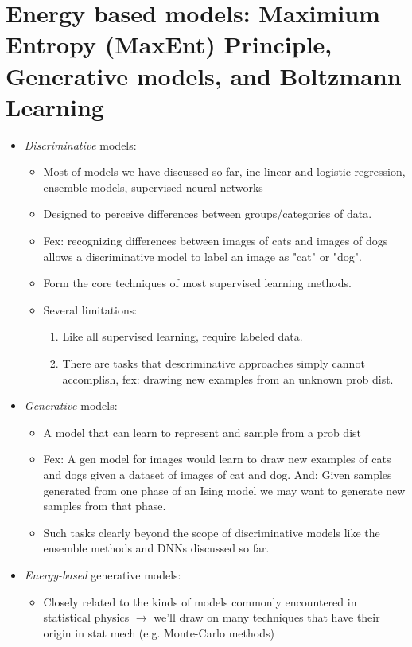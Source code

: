 \documentclass[norsk,a4paper,11pt]{article}
\begin{document}
\section{Energy based models: Maximium Entropy (MaxEnt) Principle, Generative models, and Boltzmann Learning}
\begin{itemize}
	\item \textit{Discriminative} models: 
	\begin{itemize}
		\item Most of models we have discussed so far, inc linear and logistic regression, ensemble models, supervised neural networks
		\item Designed to perceive differences between groups/categories of data.
		\item Fex: recognizing differences between images of cats and images of dogs allows a discriminative model to label an image as "cat" or "dog".
		\item Form the core techniques of most supervised learning methods.
		\item Several limitations: 
		\begin{enumerate}
			\item Like all supervised learning, require labeled data.
			\item There are tasks that descriminative approaches simply cannot accomplish, fex: drawing new examples from an unknown prob dist. 
		\end{enumerate}
	\end{itemize}
	\item \textit{Generative} models:
	\begin{itemize}
		\item A model that can learn to represent and sample from a prob dist
		\item Fex: A gen model for images would learn to draw new examples of cats and dogs given a dataset of images of cat and dog. And: Given samples generated from one phase of an Ising model we may want to generate new samples from that phase.
		\item Such tasks clearly beyond the scope of discriminative models like the ensemble methods and DNNs discussed so far.
	\end{itemize}
	\item \textit{Energy-based} generative models:
	\begin{itemize}
		\item Closely related to the kinds of models commonly encountered in statistical physics $\rightarrow$ we'll draw on many techniques that have their origin in stat mech (e.g. Monte-Carlo methods)

\end{itemize}
\end{itemize}
\end{document}

